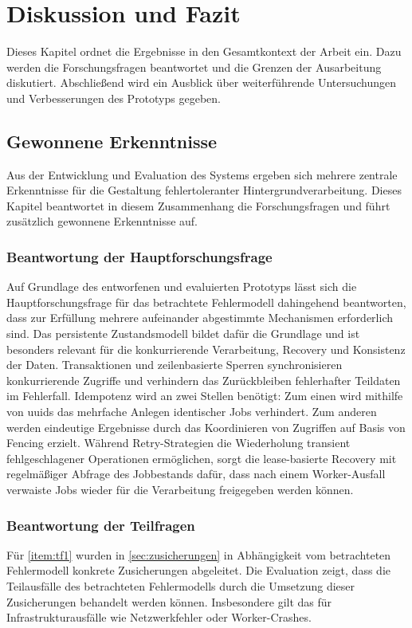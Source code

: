
\chapter{Diskussion und Fazit}
\label{ch:diskussion}
Dieses Kapitel ordnet die Ergebnisse in den Gesamtkontext der Arbeit ein.
Dazu werden die Forschungsfragen beantwortet und die Grenzen der Ausarbeitung diskutiert.
Abschließend wird ein Ausblick über weiterführende Untersuchungen und Verbesserungen des Prototyps gegeben.

\section{Gewonnene Erkenntnisse}
\label{sec:erkenntnisse}
Aus der Entwicklung und Evaluation des Systems ergeben sich mehrere zentrale Erkenntnisse für die Gestaltung fehlertoleranter
Hintergrundverarbeitung.
Dieses Kapitel beantwortet in diesem Zusammenhang die Forschungsfragen und führt zusätzlich gewonnene Erkenntnisse auf.

\subsection{Beantwortung der Hauptforschungsfrage}
\label{subsec:beantwortungHauptfrage}
Auf Grundlage des entworfenen und evaluierten Prototyps lässt sich die Hauptforschungsfrage für das betrachtete Fehlermodell dahingehend
beantworten, dass zur Erfüllung mehrere aufeinander abgestimmte Mechanismen erforderlich sind.
Das persistente Zustandsmodell bildet dafür die Grundlage und ist besonders relevant für die konkurrierende Verarbeitung,
Recovery und Konsistenz der Daten.
Transaktionen und zeilenbasierte Sperren synchronisieren konkurrierende Zugriffe und verhindern das Zurückbleiben fehlerhafter
Teildaten im Fehlerfall.
Idempotenz wird an zwei Stellen benötigt: Zum einen wird mithilfe von \gls{uuid}s das mehrfache Anlegen identischer Jobs verhindert.
Zum anderen werden eindeutige Ergebnisse durch das Koordinieren von Zugriffen auf Basis von Fencing erzielt.
Während Retry-Strategien die Wiederholung transient fehlgeschlagener Operationen ermöglichen, sorgt
die lease-basierte Recovery mit regelmäßiger Abfrage des Jobbestands dafür, dass nach einem Worker-Ausfall verwaiste
Jobs wieder für die Verarbeitung freigegeben werden können.

\subsection{Beantwortung der Teilfragen}
\label{subsec:beantwortungTeilfragen}
Für \ref{item:tf1} wurden in \cref{sec:zusicherungen} in Abhängigkeit vom betrachteten Fehlermodell konkrete Zusicherungen abgeleitet.
Die Evaluation zeigt, dass die Teilausfälle des betrachteten Fehlermodells durch die Umsetzung dieser Zusicherungen behandelt werden können.
Insbesondere gilt das für Infrastrukturausfälle wie Netzwerkfehler oder Worker-Crashes.

